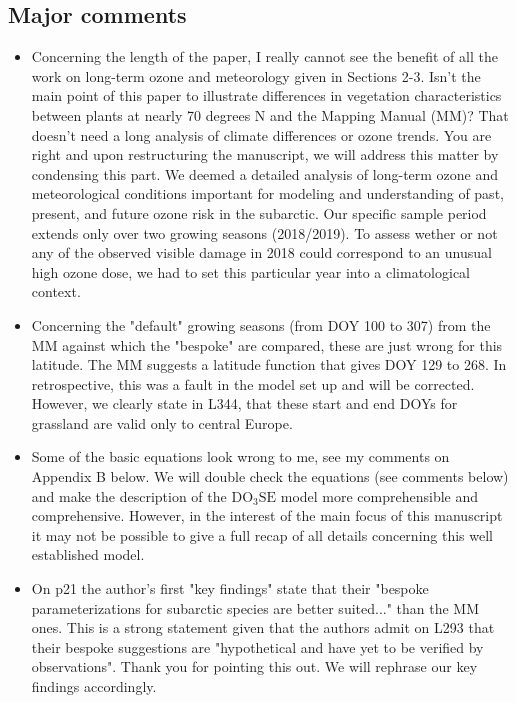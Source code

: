 \documentclass{scrartcl}
\begin{document}
\subsection*{Major comments} 
\begin{itemize}
    
    \item {\color{blue}Concerning the length of the paper, I really cannot see the benefit of all the work on long-term ozone and meteorology given in Sections 2-3. Isn't the main point of this paper to illustrate differences in vegetation characteristics between plants at nearly 70 degrees N and the Mapping Manual (MM)? That doesn't need a long analysis of climate differences or ozone trends.} You are right and upon restructuring the manuscript, we will address this matter by condensing this part. We deemed a detailed analysis of long-term ozone and meteorological conditions important for modeling and understanding of past, present, and future ozone risk in the subarctic. Our specific sample period extends only over two growing seasons (2018/2019). To assess wether or not any of the observed visible damage in 2018 could correspond to an unusual high ozone dose, we had to set this particular year into a climatological context. 
    
    \item {\color{blue}Concerning the "default" growing seasons (from DOY 100 to 307) from the MM against which the "bespoke" are compared, these are just wrong for this latitude. The MM suggests a latitude function that gives DOY 129 to 268.} In retrospective, this was a fault in the model set up and will be corrected. However, we clearly state in L344, that these start and end DOYs for grassland are valid only to central Europe.
    
    \item {\color{blue}Some of the basic equations look wrong to me, see my comments on Appendix B below.} We will double check the equations (see comments below) and make the description of the $\mathrm{DO_3SE}$ model more comprehensible and comprehensive. However, in the interest of the main focus of this manuscript it may not be possible to give a full recap of all details concerning this well established model.
    
    \item {\color{blue}On p21 the author's first "key findings" state that their "bespoke parameterizations for subarctic species are better suited..." than the MM ones. This is a strong statement given that the authors admit on L293 that their bespoke suggestions are "hypothetical and have yet to be verified by observations".} Thank you for pointing this out. We will rephrase our key findings accordingly.

\end{itemize}
\end{document}
